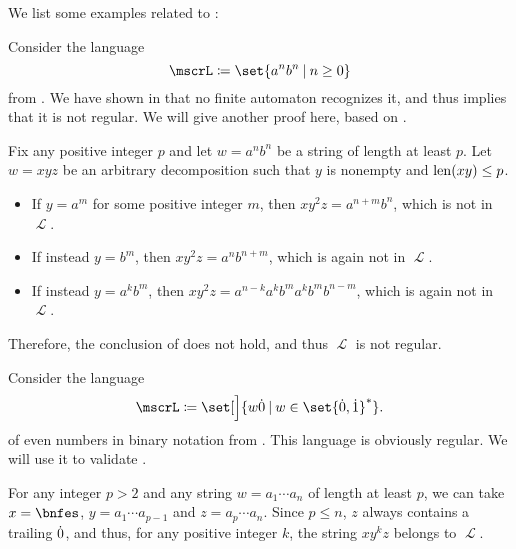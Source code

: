 \begin{example}\label{ex:thm:regular_pumping_lemma}
  We list some examples related to :
  \begin{thmenum}
     Consider the language
    \begin{equation*}
      \mscrL \coloneqq \set{ a^n b^n \given n \geq 0 }
    \end{equation*}
    from . We have shown in  that no finite automaton recognizes it, and thus  implies that it is not regular. We will give another proof here, based on .

    Fix any positive integer \( p \) and let \( w = a^n b^n \) be a string of length at least \( p \). Let \( w = xyz \) be an arbitrary decomposition such that \( y \) is nonempty and \( \operatorname{len}(xy) \leq p \).

    \begin{itemize}
      \item If \( y = a^m \) for some positive integer \( m \), then \( x y^2 z = a^{n + m} b^n \), which is not in \( \mscrL \).
      \item If instead \( y = b^m \), then \( x y^2 z = a^n b^{n + m} \), which is again not in \( \mscrL \).
      \item If instead \( y = a^k b^m \), then \( x y^2 z = a^{n-k} a^k b^m a^k b^m b^{n - m} \), which is again not in \( \mscrL \).
    \end{itemize}

    Therefore, the conclusion of  does not hold, and thus \( \mscrL \) is not regular.

     Consider the language
    \begin{equation*}
      \mscrL \coloneqq \set[\Big]{ w \syn0 \given w \in \set{ \syn0, \syn1 }^* }.
    \end{equation*}
    of even numbers in binary notation from . This language is obviously regular. We will use it to validate .

    For any integer \( p > 2 \) and any string \( w = a_1 \cdots a_n \) of length at least \( p \), we can take \( x = \bnfes \), \( y = a_1 \cdots a_{p-1} \) and \( z = a_p \cdots a_n \). Since \( p \leq n \), \( z \) always contains a trailing \( \dot{0} \), and thus, for any positive integer \( k \), the string \( xy^kz \) belongs to \( \mscrL \).


\end{thmenum}
\end{example}
